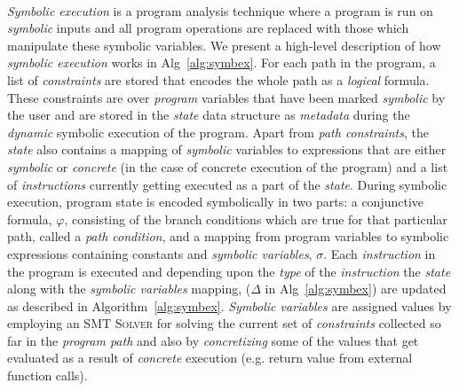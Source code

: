 \begin{algorithm}
\begin{algorithmic}[1]
		 \label{line:true_state}
		 \label{line:false_state}
		 
		\EndCase
		 
		\EndCase
		\EndSwitch
		\EndWhile \\
		\EndFunction
	\end{algorithmic}
\end{algorithm}

\textit{Symbolic execution} is a program analysis technique where a program is run on \textit{symbolic} inputs and all program operations are replaced with those which manipulate these symbolic variables.
%
We present a high-level description of how \textit{symbolic execution} works in Alg~\ref{alg:symbex}. 
% 
For each path in the program, a list of \textit{constraints} are stored that encodes the whole path as a \textit{logical}
formula.
% 
These constraints are over \textit{program} variables that have been marked \textit{symbolic} by the user and are stored in the \textit{state} data structure as \textit{metadata} during the \textit{dynamic} symbolic execution of the program.
% 
Apart from \textit{path constraints}, the \textit{state} also contains a mapping of \textit{symbolic} variables to expressions that are either  \textit{symbolic} or \textit{concrete} (in the case of concrete execution of the program) and a list of \textit{instructions} currently getting executed as a part of the \textit{state}.	
% 
During symbolic execution, program state is encoded symbolically in two parts: a conjunctive formula, $\varphi$, consisting of the branch conditions which are true for that particular path, called a \textit{path condition}, and a mapping from program variables to symbolic expressions containing constants and \textit{symbolic variables}, $\sigma$.
% 
Each \textit{instruction} in the program is executed and depending upon the \textit{type} of the \textit{instruction} the \textit{state} along with the \textit{symbolic variables} mapping, ($\Delta$ in Alg~\ref{alg:symbex}) are updated as described in Algorithm~\ref{alg:symbex}.
% 
\textit{Symbolic variables} are assigned values by employing an \textsc{SMT Solver} for solving the current set of \textit{constraints} collected so far in the \textit{program path} and also by \textit{concretizing} some of the values that get evaluated as a result of \textit{concrete} execution (e.g. return value from external function calls).
